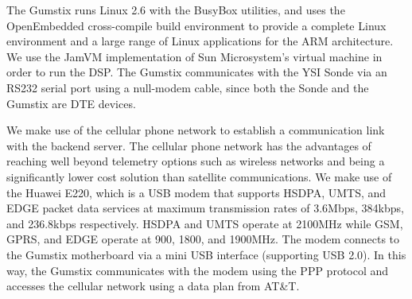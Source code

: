 \documentclass[conference]{IEEEtran}
\begin{document}
The Gumstix runs Linux 2.6 with the BusyBox utilities, and uses the
OpenEmbedded cross-compile build environment to provide a complete
Linux environment and a large range of Linux applications for the ARM
architecture.  We use the JamVM \cite{jamvm01} implementation of Sun
Microsystem's virtual machine in order to run the DSP. The Gumstix
communicates with the YSI Sonde via an RS232 serial port using a
null-modem cable, since both the Sonde and the Gumstix are DTE devices.



 

We make use of the cellular phone network to establish a communication
link with the backend server. The cellular phone network has the
advantages of reaching well beyond telemetry options such as wireless
networks and being a significantly lower cost solution than satellite
communications. We make use of the Huawei E220, which is a USB
modem that supports HSDPA, UMTS, and EDGE packet data services at
maximum transmission rates of 3.6Mbps, 384kbps, and 236.8kbps
respectively.  HSDPA and UMTS operate at 2100MHz while GSM, GPRS, and
EDGE operate at 900, 1800, and 1900MHz. The modem connects to the
Gumstix motherboard via a mini USB interface (supporting USB 2.0). In this
way, the Gumstix communicates with the modem using the PPP protocol and
accesses the cellular network using a data plan from AT\&T.
\end{document}

